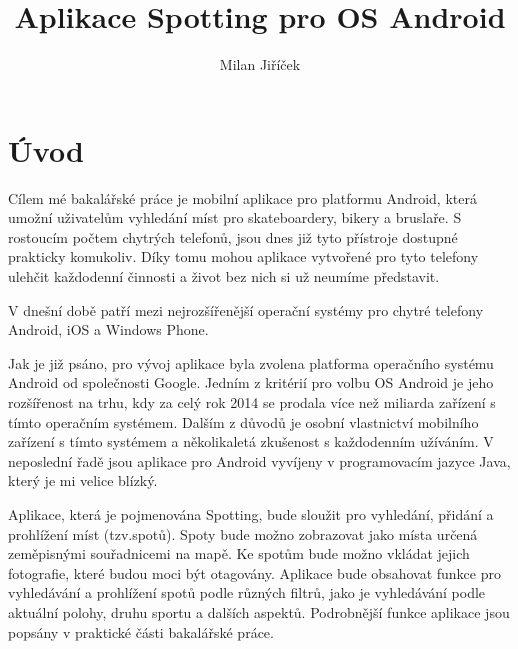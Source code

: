 \documentclass[12pt]{article}
\title{Aplikace Spotting pro OS Android}
\author{Milan Jiříček}
\begin{document}
\maketitle

\newpage

\section{Úvod}
Cílem mé bakalářské práce je mobilní aplikace pro platformu Android, která umožní uživatelům vyhledání míst pro skateboardery, bikery a bruslaře. S rostoucím počtem chytrých telefonů, jsou dnes již tyto přístroje dostupné prakticky komukoliv. Díky tomu mohou aplikace vytvořené pro tyto telefony ulehčit každodenní činnosti a život bez nich si už neumíme představit.

V dnešní době patří mezi nejrozšířenější operační systémy pro chytré telefony Android, iOS a Windows Phone.

Jak je již psáno, pro vývoj aplikace byla zvolena platforma operačního systému Android od společnosti Google. Jedním z kritérií pro volbu OS Android je jeho rozšířenost na trhu, kdy za celý rok 2014 se prodala více než miliarda zařízení s tímto operačním systémem. Dalším z důvodů je osobní vlastnictví mobilního zařízení s tímto systémem a několikaletá zkušenost s každodenním užíváním. V neposlední řadě jsou aplikace pro Android vyvíjeny v programovacím jazyce Java, který je mi velice blízký.

Aplikace, která je pojmenována Spotting, bude sloužit pro vyhledání, přidání a prohlížení míst (tzv.spotů). Spoty bude možno zobrazovat jako místa určená zeměpisnými souřadnicemi na mapě. Ke spotům bude možno vkládat jejich fotografie, které budou moci být otagovány. Aplikace bude obsahovat funkce pro vyhledávání a prohlížení spotů  podle různých filtrů, jako je vyhledávání podle aktuální polohy, druhu sportu a dalších aspektů. Podrobnější funkce aplikace jsou popsány v praktické části bakalářské práce.
\newpage
\end{document}
